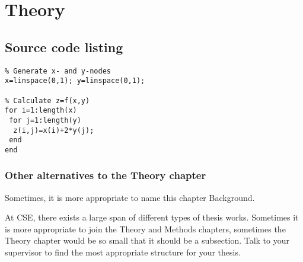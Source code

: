 \chapter{Theory}

\section{Source code listing}
\begin{verbatim}
% Generate x- and y-nodes
x=linspace(0,1); y=linspace(0,1);

% Calculate z=f(x,y)
for i=1:length(x)
 for j=1:length(y)
  z(i,j)=x(i)+2*y(j);
 end
end
\end{verbatim}

\subsection{Other alternatives to the Theory chapter}
Sometimes, it is more appropriate to name this chapter Background.

At CSE, there exists a large span of different types of thesis works. Sometimes it is more appropriate to join the Theory and Methods chapters, sometimes the Theory chapter would be so small that it should be a subsection. Talk to your supervisor to find the most appropriate structure for your thesis.
